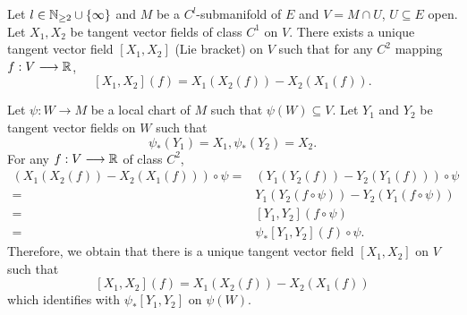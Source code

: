 \begin{propositionenv}
    Let $l \in \mathbb{N}_{\ge 2} \cup \{\infty\}$ and $M$ be a $C^l$-submanifold of $E$ and $V = M \cap U$, $U \subseteq E$ open.
    Let $X_1,X_2$ be tangent vector fields of class $C^1$ on $V$.
    There exists a unique tangent vector field $[X_1,X_2]$ (Lie bracket) on $V$ such that for any $C^2$ mapping $f : V \longrightarrow \mathbb{R}$,
    $$[X_1,X_2](f) = X_1(X_2(f)) - X_2(X_1(f)).$$
\end{propositionenv}
\begin{proofenv}
    Let $\psi: W \longrightarrow M$ be a local chart  of $M$ such that $\psi(W) \subseteq V$.
    Let $Y_1$ and $Y_2$ be tangent vector fields on $W$ such that
    $$\psi_*(Y_1) = X_1, \psi_*(Y_2) = X_2.$$
    For any $f : V \longrightarrow \mathbb{R}$ of class $C^2$, 
    $$\begin{aligned}
        \left(X_1(X_2(f)) - X_2(X_1(f))\right) \circ \psi = & \left(Y_1(Y_2(f)) - Y_2(Y_1(f))\right) \circ \psi\\
        = & Y_1(Y_2(f \circ \psi)) - Y_2(Y_1(f \circ \psi))\\
        = & [Y_1,Y_2](f \circ \psi)\\
        = & \psi_*[Y_1,Y_2](f)\circ \psi.
    \end{aligned}$$
    Therefore, we obtain that there is a unique tangent vector field $[X_1,X_2]$ on $V$ such that
    $$[X_1,X_2](f) = X_1(X_2(f)) - X_2(X_1(f))$$
    which identifies with $\psi_*[Y_1,Y_2]$ on $\psi(W)$.
\end{proofenv}

